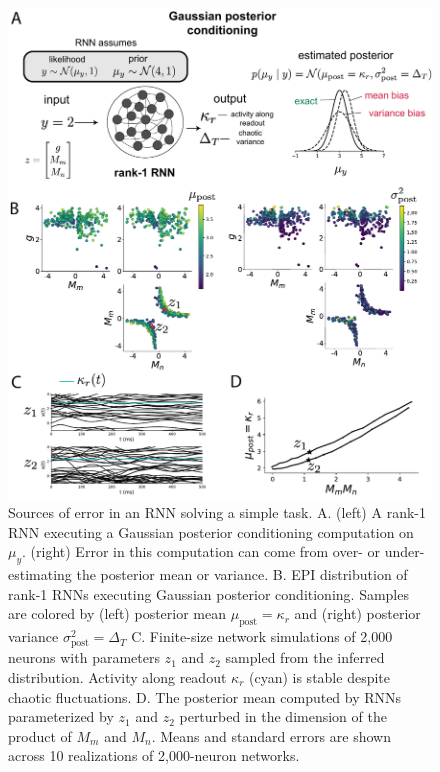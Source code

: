 \documentclass[11pt]{article}
\begin{document}
\begin{figure}
\begin{center}
\includegraphics[scale=0.75]{figures/fig5/fig5.pdf}
\end{center}
\caption{\small Sources of error in an RNN solving a simple task.  A. (left) A rank-1 RNN executing a Gaussian posterior conditioning computation on $\mu_y$. (right) Error in this computation can come from over- or under-estimating the posterior mean or variance. B. EPI distribution of rank-1 RNNs executing Gaussian posterior conditioning.  Samples are colored by (left) posterior mean $\mu_{\text{post}}=\kappa_r$ and (right) posterior variance $\sigma^2_{\text{post}}=\Delta_T$  C.  Finite-size network simulations of 2,000 neurons with parameters $z_1$ and $z_2$ sampled from the inferred distribution.  Activity along readout $\kappa_r$ (cyan) is stable despite chaotic fluctuations.  D. The posterior mean computed by RNNs parameterized by $z_1$ and $z_2$ perturbed in the dimension of the product of $M_m$ and $M_n$.  Means and standard errors are shown across 10 realizations of 2,000-neuron networks.}
\label{fig:RNN}
\end{figure}
\end{document}
